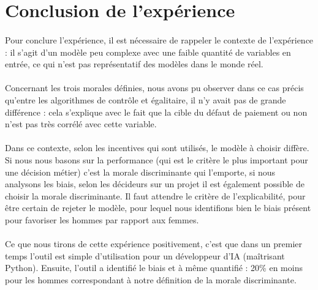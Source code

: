 \documentclass[10pt, french, a4paper]{report}
\begin{document}
\section{Conclusion de l'expérience}

\paragraph{}
Pour conclure l'expérience, il est nécessaire de rappeler le contexte de l'expérience : il s'agit d'un modèle peu complexe avec une faible quantité de variables en entrée, ce qui n'est pas représentatif des modèles dans le monde réel. 

\paragraph{}
Concernant les trois morales définies, nous avons pu observer dans ce cas précis qu'entre les algorithmes de contrôle et égalitaire, il n'y avait pas de grande différence : cela s'explique avec le fait que la cible du défaut de paiement ou non n'est pas très corrélé avec cette variable. 

\paragraph{}
Dans ce contexte, selon les incentives qui sont utilisés, le modèle à choisir diffère. Si nous nous basons sur la performance (qui est le critère le plus important pour une décision métier) c'est la morale discriminante qui l'emporte, si nous analysons les biais, selon les décideurs sur un projet il est également possible de choisir la morale discriminante. Il faut attendre le critère de l'explicabilité, pour être certain de rejeter le modèle, pour lequel nous identifions bien le biais présent pour favoriser les hommes par rapport aux femmes.

\paragraph{}
Ce que nous tirons de cette expérience positivement, c'est que dans un premier temps l'outil est simple d'utilisation pour un développeur d'IA (maîtrisant Python). Ensuite, l'outil a identifié le biais et à même quantifié : 20\% en moins pour les hommes correspondant à notre définition de la morale discriminante.
\end{document}
